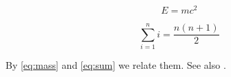 \begin{equation}
\label{eq:mass}
E = mc^2
\end{equation}

\begin{equation}
\label{eq:sum}
\sum_{i=1}^n i = \frac{n(n+1)}{2}
\end{equation}

By \ref{eq:mass} and \cref{eq:sum} we relate them. See also .

